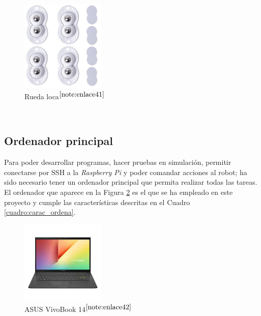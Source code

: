 \begin{figure} [h!]
	\begin{center}
		\includegraphics[width=4cm]{figs/ruedaloca.png}
	\end{center}
	\caption{Rueda loca$^{\ref{note:enlace41}}$} 
	\label{fig:ruedaloca}
\end{figure}\

\setcounter{footnote}{41} %

\subsection{Ordenador principal}

Para poder desarrollar programas, hacer pruebas en simulación, permitir conectarse por SSH a la \textit{Raspberry Pi} y poder comandar acciones al robot; ha sido necesario tener un ordenador principal que permita realizar todas las tareas. El ordenador que aparece en la Figura \ref{fig:ordenador} es el que se ha empleado en este proyecto y cumple las características descritas en el Cuadro \ref{cuadro:carac_ordena}.


\begin{figure} [h!]
	\begin{center}
		\includegraphics[width=4cm]{figs/ordenador.png}
	\end{center}
	\caption{ASUS VivoBook 14$^{\ref{note:enlace42}}$} 
	\label{fig:ordenador}
\end{figure}\

